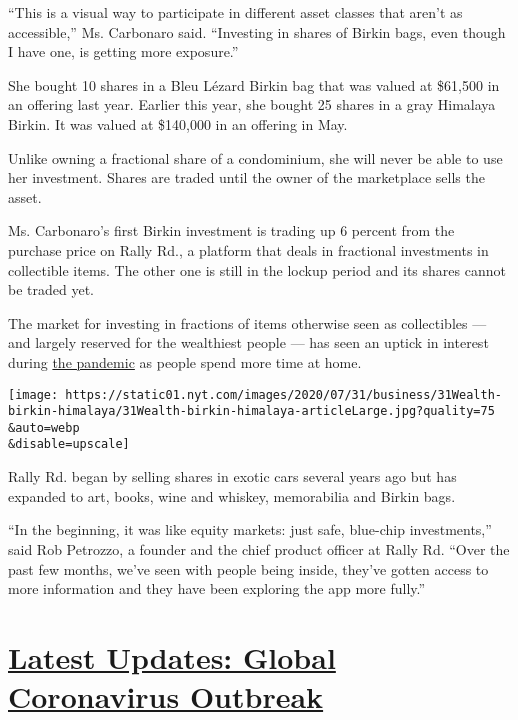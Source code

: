 ``This is a visual way to participate in different asset classes that
aren't as accessible,'' Ms. Carbonaro said. ``Investing in shares of
Birkin bags, even though I have one, is getting more exposure.''

She bought 10 shares in a Bleu Lézard Birkin bag that was valued at
\$61,500 in an offering last year. Earlier this year, she bought 25
shares in a gray Himalaya Birkin. It was valued at \$140,000 in an
offering in May.

Unlike owning a fractional share of a condominium, she will never be
able to use her investment. Shares are traded until the owner of the
marketplace sells the asset.

Ms. Carbonaro's first Birkin investment is trading up 6 percent from the
purchase price on Rally Rd., a platform that deals in fractional
investments in collectible items. The other one is still in the lockup
period and its shares cannot be traded yet.

The market for investing in fractions of items otherwise seen as
collectibles --- and largely reserved for the wealthiest people --- has
seen an uptick in interest during
\href{https://www.nytimes.com/news-event/coronavirus}{the pandemic} as
people spend more time at home.

\texttt{[image: https://static01.nyt.com/images/2020/07/31/business/31Wealth-birkin-himalaya/31Wealth-birkin-himalaya-articleLarge.jpg?quality=75\\\&auto=webp\\\&disable=upscale]}

Rally Rd. began by selling shares in exotic cars several years ago but
has expanded to art, books, wine and whiskey, memorabilia and Birkin
bags.

``In the beginning, it was like equity markets: just safe, blue-chip
investments,'' said Rob Petrozzo, a founder and the chief product
officer at Rally Rd. ``Over the past few months, we've seen with people
being inside, they've gotten access to more information and they have
been exploring the app more fully.''

\hypertarget{latest-updates-global-coronavirus-outbreak}{%
\section{\texorpdfstring{\href{https://www.nytimes.com/2020/08/01/world/coronavirus-covid-19.html?action=click\&pgtype=Article\&state=default\&region=MAIN_CONTENT_1\&context=storylines_live_updates}{Latest
Updates: Global Coronavirus
Outbreak}}{Latest Updates: Global Coronavirus Outbreak}}\label{latest-updates-global-coronavirus-outbreak}}

